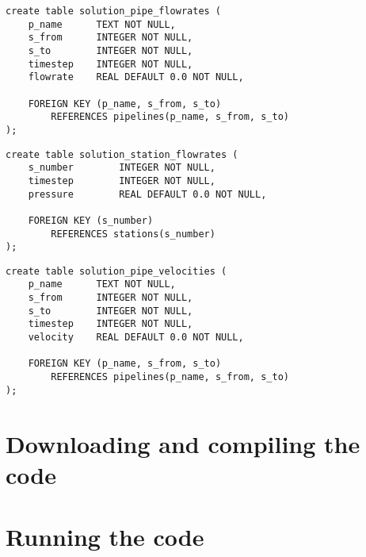 \documentclass[10pt]{article}
\begin{document}
\begin{verbatim}
create table solution_pipe_flowrates (
    p_name      TEXT NOT NULL,
    s_from      INTEGER NOT NULL,
    s_to        INTEGER NOT NULL,
    timestep    INTEGER NOT NULL,
    flowrate    REAL DEFAULT 0.0 NOT NULL,

    FOREIGN KEY (p_name, s_from, s_to)
        REFERENCES pipelines(p_name, s_from, s_to)
);
\end{verbatim}

\begin{verbatim}
create table solution_station_flowrates (
    s_number        INTEGER NOT NULL,
    timestep        INTEGER NOT NULL,
    pressure        REAL DEFAULT 0.0 NOT NULL,
    
    FOREIGN KEY (s_number)
        REFERENCES stations(s_number)
);
\end{verbatim}

\begin{verbatim}
create table solution_pipe_velocities (
    p_name      TEXT NOT NULL,
    s_from      INTEGER NOT NULL,
    s_to        INTEGER NOT NULL,
    timestep    INTEGER NOT NULL,
    velocity    REAL DEFAULT 0.0 NOT NULL,

    FOREIGN KEY (p_name, s_from, s_to)
        REFERENCES pipelines(p_name, s_from, s_to)
);
\end{verbatim}

\section{Downloading and compiling the code}

\section{Running the code}
\end{document}
